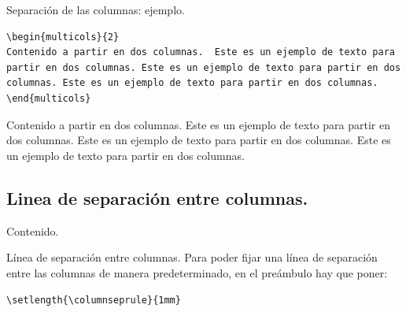 \documentclass[dvipsnames,xcolor, handout]{beamer}
\theoremstyle{plain}
\theoremstyle{definition}
\begin{document}
{
\setlength{\columnsep}{3cm}
\begin{frame}[fragile]{Separación de las columnas: ejemplo.}
\begin{footnotesize}
\begin{verbatim}
\begin{multicols}{2}
Contenido a partir en dos columnas.  Este es un ejemplo de texto para
partir en dos columnas. Este es un ejemplo de texto para partir en dos
columnas. Este es un ejemplo de texto para partir en dos columnas. 
\end{multicols}
\end{verbatim}
\end{footnotesize}
\vfill\pause
\begin{footnotesize}
    \begin{multicols}{2}
    Contenido a partir en dos columnas.  Este es un ejemplo de texto para
partir en dos columnas. Este es un ejemplo de texto para partir en dos
columnas. Este es un ejemplo de texto para partir en dos columnas. 
    \end{multicols}
\end{footnotesize}
\end{frame}
}

\subsection{Linea de separación entre columnas.}
\begin{frame}{Contenido.}
 \begin{footnotesize}
\vspace*{-1cm}
\begin{multicols}{2}
  \tableofcontents[currentsubsection]
\end{multicols}
\end{footnotesize}
\end{frame}

\begin{frame}[fragile]{Línea de separación entre columnas.}
Para poder fijar una línea de separación entre las columnas de manera predeterminado, en el preámbulo hay que poner:

\verb!\setlength{\columnseprule}{1mm}!

\end{frame}
\end{document}

